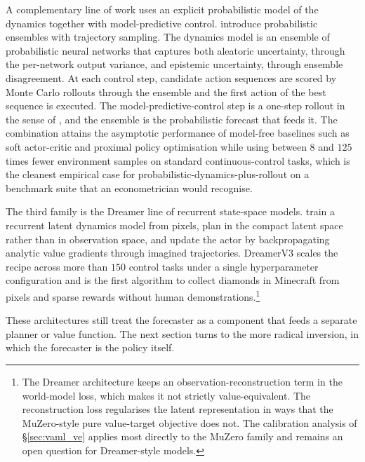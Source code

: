 A complementary line of work uses an explicit probabilistic model of the
dynamics together with model-predictive control. \citet{Chua2018PETS}
introduce probabilistic ensembles with trajectory sampling. The dynamics
model is an ensemble of probabilistic neural networks that captures both
aleatoric uncertainty, through the per-network output variance, and
epistemic uncertainty, through ensemble disagreement. At each control
step, candidate action sequences are scored by Monte Carlo rollouts
through the ensemble and the first action of the best sequence is
executed. The model-predictive-control step is a one-step rollout in the
sense of \citet{BertsekasRollout2022}, and the ensemble is the
probabilistic forecast that feeds it. The combination attains the
asymptotic performance of model-free baselines such as soft actor-critic
and proximal policy optimisation while using between $8$ and $125$ times
fewer environment samples on standard continuous-control tasks, which is
the cleanest empirical case for probabilistic-dynamics-plus-rollout on a
benchmark suite that an econometrician would recognise.

The third family is the Dreamer line of recurrent state-space models.
\citet{HafnerDreamer2020} train a recurrent latent dynamics model from
pixels, plan in the compact latent space rather than in observation
space, and update the actor by backpropagating analytic value gradients
through imagined trajectories. DreamerV3 \citep{HafnerDreamerV3_2025}
scales the recipe across more than $150$ control tasks under a single
hyperparameter configuration and is the first algorithm to collect
diamonds in Minecraft from pixels and sparse rewards without human
demonstrations.\footnote{The Dreamer architecture keeps an
observation-reconstruction term in the world-model loss, which makes it
not strictly value-equivalent. The reconstruction loss regularises the
latent representation in ways that the MuZero-style pure value-target
objective does not. The \citet{VoelckerCalib2025} calibration analysis of
\S\ref{sec:vaml_ve} applies most directly to the MuZero family and remains
an open question for Dreamer-style models.}

These architectures still treat the forecaster as a component that feeds
a separate planner or value function. The next section turns to the more
radical inversion, in which the forecaster is the policy itself.
